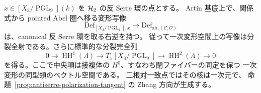 \begin{corollary}[形式的な偏極忘却の分裂]
\label{cor:artin-polarization-retraction}
$x\in[X_3/\operatorname{PGL}_9](k)$ を $\mathcal H_2$ の反 Serre 環の点とする。
Artin 基底上で、関係式から pointed Abel 圏へ移る変形写像
\[
 \mathrm{Def}_{[X_3/\operatorname{PGL}_9],x}
 \longrightarrow\mathrm{Def}_{\mathrm{ab},(\mathcal C,\mathcal O)}
\]
は、canonical 反 Serre 環を取る右逆を持つ。
従って一次変形空間上の写像は分裂全射である。さらに標準的な分裂完全列
\[
 0\longrightarrow\operatorname{HH}^{1}(\Lambda)
 \longrightarrow T_x[X_3/\operatorname{PGL}_9]
 \longrightarrow\operatorname{HH}^{2}(\Lambda)
 \longrightarrow0
 \tag{Artin-pol}\label{eq:artin-polarization-tangent-split}
\]
を得る。ここで中央項は接複体の $H^0$、すなわち閉ファイバーの同定を保つ
一次変形の同型類のベクトル空間である。
二根対一致点ではその核は一次元で、
命題~\ref{prop:antiserre-polarization-tangent} の Zhang 方向が生成する。
\end{corollary}
